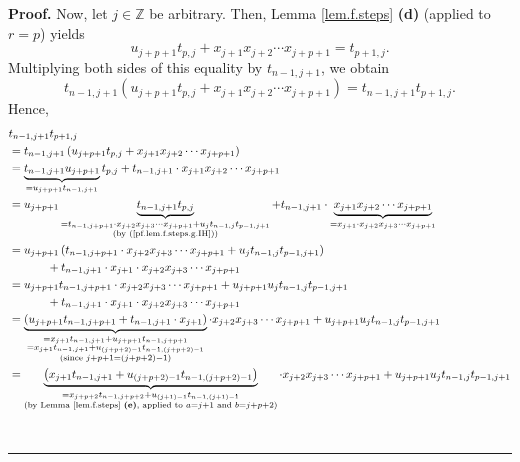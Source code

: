 \documentclass[numbers=enddot,12pt,final,onecolumn,notitlepage]{scrartcl}%
\theoremstyle{definition}
\newenvironment{proof}[1][Proof]{\noindent\textbf{#1.} }{\ \rule{0.5em}{0.5em}}
\newenvironment{verlong}{}{}
\begin{document}
\begin{proof}
\begin{verlong}
Now, let $j\in\mathbb{Z}$ be arbitrary. Then, Lemma \ref{lem.f.steps}
\textbf{(d)} (applied to $r=p$) yields%
\[
u_{j+p+1}t_{p,j}+x_{j+1}x_{j+2}\cdots x_{j+p+1}=t_{p+1,j}.
\]
Multiplying both sides of this equality by $t_{n-1,j+1}$, we obtain%
\[
t_{n-1,j+1}\left(  u_{j+p+1}t_{p,j}+x_{j+1}x_{j+2}\cdots x_{j+p+1}\right)
=t_{n-1,j+1}t_{p+1,j}.
\]
Hence,%
\begin{align*}
&  t_{n-1,j+1}t_{p+1,j}\\
&  =t_{n-1,j+1}\left(  u_{j+p+1}t_{p,j}+x_{j+1}x_{j+2}\cdots x_{j+p+1}\right)
\\
&  =\underbrace{t_{n-1,j+1}u_{j+p+1}}_{=u_{j+p+1}t_{n-1,j+1}}t_{p,j}%
+t_{n-1,j+1}\cdot x_{j+1}x_{j+2}\cdots x_{j+p+1}\\
&  =u_{j+p+1}\underbrace{t_{n-1,j+1}t_{p,j}}_{\substack{=t_{n-1,j+p+1}\cdot
x_{j+2}x_{j+3}\cdots x_{j+p+1}+u_{j}t_{n-1,j}t_{p-1,j+1}\\\text{(by
(\ref{pf.lem.f.steps.g.IH}))}}}+t_{n-1,j+1}\cdot\underbrace{x_{j+1}%
x_{j+2}\cdots x_{j+p+1}}_{=x_{j+1}\cdot x_{j+2}x_{j+3}\cdots x_{j+p+1}}\\
&  =u_{j+p+1}\left(  t_{n-1,j+p+1}\cdot x_{j+2}x_{j+3}\cdots x_{j+p+1}%
+u_{j}t_{n-1,j}t_{p-1,j+1}\right) \\
&  \ \ \ \ \ \ \ \ \ \ +t_{n-1,j+1}\cdot x_{j+1}\cdot x_{j+2}x_{j+3}\cdots
x_{j+p+1}\\
&  =u_{j+p+1}t_{n-1,j+p+1}\cdot x_{j+2}x_{j+3}\cdots x_{j+p+1}+u_{j+p+1}%
u_{j}t_{n-1,j}t_{p-1,j+1}\\
&  \ \ \ \ \ \ \ \ \ \ +t_{n-1,j+1}\cdot x_{j+1}\cdot x_{j+2}x_{j+3}\cdots
x_{j+p+1}\\
&  =\underbrace{\left(  u_{j+p+1}t_{n-1,j+p+1}+t_{n-1,j+1}\cdot x_{j+1}%
\right)  }_{\substack{=x_{j+1}t_{n-1,j+1}+u_{j+p+1}t_{n-1,j+p+1}%
\\=x_{j+1}t_{n-1,j+1}+u_{\left(  j+p+2\right)  -1}t_{n-1,\left(  j+p+2\right)
-1}\\\text{(since }j+p+1=\left(  j+p+2\right)  -1\text{)}}}\cdot
x_{j+2}x_{j+3}\cdots x_{j+p+1}+u_{j+p+1}u_{j}t_{n-1,j}t_{p-1,j+1}\\
&  =\underbrace{\left(  x_{j+1}t_{n-1,j+1}+u_{\left(  j+p+2\right)
-1}t_{n-1,\left(  j+p+2\right)  -1}\right)  }_{\substack{=x_{j+p+2}%
t_{n-1,j+p+2}+u_{\left(  j+1\right)  -1}t_{n-1,\left(  j+1\right)
-1}\\\text{(by Lemma \ref{lem.f.steps} \textbf{(e)}, applied to }a=j+1\text{
and }b=j+p+2\text{)}}}\cdot x_{j+2}x_{j+3}\cdots x_{j+p+1}+u_{j+p+1}%
u_{j}t_{n-1,j}t_{p-1,j+1}\\

\end{align*}
\end{verlong}
\end{proof}
\end{document}
